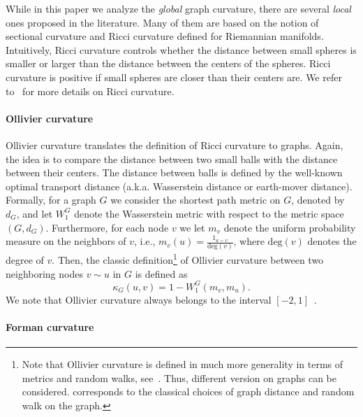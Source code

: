 \documentclass{article} %
\begin{document}
While in this paper we analyze the \textit{global} graph curvature, there are several \textit{local} ones proposed in the literature. Many of them are based on the notion of sectional curvature and Ricci curvature defined for Riemannian manifolds. Intuitively, Ricci curvature controls whether the distance between small spheres is smaller or larger than the distance between the centers of the spheres. Ricci curvature is positive if small spheres are closer than their centers are. We refer to~\citep{jost2009geometry,oneill1983semiriemannian} for more details on Ricci curvature.

\paragraph{Ollivier curvature}

Ollivier curvature translates the definition of Ricci curvature to graphs. Again, the idea is to compare the distance between two small balls with the distance between their centers. The distance between balls is defined by the well-known optimal transport distance (a.k.a. Wasserstein distance or earth-mover distance).
Formally, for a graph $G$ we consider the shortest path metric on $G$, denoted by $d_G$, and let $W_1^G$ denote the Wasserstein metric with respect to the metric space $(G,d_G)$. Furthermore, for each node $v$ we let $m_v$ denote the uniform probability measure on the neighbors of $v$, i.e., $m_v(u) = \frac{1_{u \sim v}}{\mathrm{deg}(v)}$, where $\mathrm{deg}(v)$ denotes the degree of $v$. Then, the classic definition\footnote{Note that Ollivier curvature is defined in much more generality in terms of metrics and random walks, see~\citep{ollivier2009ricci}. Thus, different version on graphs can be considered.  corresponds to the classical choices of graph distance and random walk on the graph.} of Ollivier curvature between two neighboring nodes $v \sim u$ in $G$ is defined as
\begin{equation}\label{eq:def_classic_ollivier_graphs}
	\kappa_G(u,v) = 1 - W_1^G(m_v, m_u).
\end{equation}
We note that Ollivier curvature always belongs to the interval $[-2,1]$~\citep{jost2014ollivier}.

\paragraph{Forman curvature}
\end{document}
